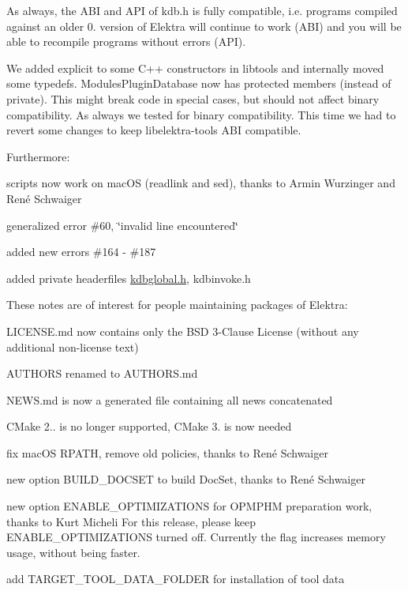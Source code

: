 As always, the A\+BI and A\+PI of kdb.\+h is fully compatible, i.\+e. programs compiled against an older 0. version of Elektra will continue to work (A\+BI) and you will be able to recompile programs without errors (A\+PI).

We added {\ttfamily explicit} to some C++ constructors in libtools and internally moved some typedefs. Modules\+Plugin\+Database now has protected members (instead of private). This might break code in special cases, but should not affect binary compatibility. As always we tested for binary compatibility. This time we had to revert some changes to keep libelektra-\/tools A\+BI compatible.

Furthermore\+:


\begin{DoxyItemize}
\item scripts now work on mac\+OS (readlink and sed), thanks to Armin Wurzinger and René Schwaiger
\item generalized error \#60, \char`\"{}invalid line encountered\char`\"{}
\item added new errors \#164 -\/ \#187
\item added private headerfiles {\ttfamily \hyperlink{kdbglobal_8h}{kdbglobal.\+h}}, {\ttfamily kdbinvoke.\+h}
\end{DoxyItemize}

These notes are of interest for people maintaining packages of Elektra\+:


\begin{DoxyItemize}
\item L\+I\+C\+E\+N\+S\+E.\+md now contains only the B\+SD 3-\/\+Clause License (without any additional non-\/license text)
\item A\+U\+T\+H\+O\+RS renamed to A\+U\+T\+H\+O\+R\+S.\+md
\item N\+E\+W\+S.\+md is now a generated file containing all news concatenated
\item C\+Make 2.. is no longer supported, C\+Make 3. is now needed
\item fix mac\+OS {\ttfamily R\+P\+A\+TH}, remove old policies, thanks to René Schwaiger
\item new option {\ttfamily B\+U\+I\+L\+D\+\_\+\+D\+O\+C\+S\+ET} to build Doc\+Set, thanks to René Schwaiger
\item new option {\ttfamily E\+N\+A\+B\+L\+E\+\_\+\+O\+P\+T\+I\+M\+I\+Z\+A\+T\+I\+O\+NS} for {\ttfamily O\+P\+M\+P\+HM} preparation work, thanks to Kurt Micheli For this release, please keep {\ttfamily E\+N\+A\+B\+L\+E\+\_\+\+O\+P\+T\+I\+M\+I\+Z\+A\+T\+I\+O\+NS} turned off. Currently the flag increases memory usage, without being faster.
\item add {\ttfamily T\+A\+R\+G\+E\+T\+\_\+\+T\+O\+O\+L\+\_\+\+D\+A\+T\+A\+\_\+\+F\+O\+L\+D\+ER} for installation of tool data
\end{DoxyItemize}

